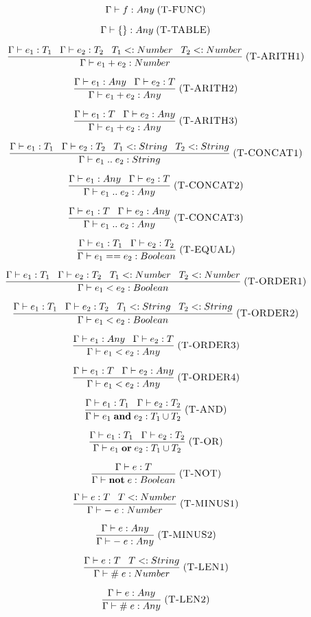 \documentclass[12pt]{article}
\newcommand{\mylabel}[1]{\; (\textsc{#1})}
\newcommand{\subtype}{<:}
\newcommand{\kw}[1]{\mathbf{#1} \;}
\newcommand{\env}{\Gamma}
\begin{document}
\[
\env \vdash f : Any
\mylabel{T-FUNC}
\]

\[
\env \vdash \{\} : Any
\mylabel{T-TABLE}
\]

\[
\frac{\env \vdash e_{1}:T_{1} \;\;\;
      \env \vdash e_{2}:T_{2} \;\;\;
      T_{1} \subtype Number \;\;\;
      T_{2} \subtype Number}
     {\env \vdash e_{1} + e_{2} : Number}
\mylabel{T-ARITH1}
\]

\[
\frac{\env \vdash e_{1}:Any \;\;\;
      \env \vdash e_{2}:T}
     {\env \vdash e_{1} + e_{2} : Any}
\mylabel{T-ARITH2}
\]

\[
\frac{\env \vdash e_{1}:T \;\;\;
      \env \vdash e_{2}:Any}
     {\env \vdash e_{1} + e_{2} : Any}
\mylabel{T-ARITH3}
\]

\[
\frac{\env \vdash e_{1}:T_{1} \;\;\;
      \env \vdash e_{2}:T_{2} \;\;\;
      T_{1} \subtype String \;\;\;
      T_{2} \subtype String}
     {\env \vdash e_{1} \; {..} \;  e_{2} : String}
\mylabel{T-CONCAT1}
\]

\[
\frac{\env \vdash e_{1}:Any \;\;\;
      \env \vdash e_{2}:T}
     {\env \vdash e_{1} \; {..} \; e_{2} : Any}
\mylabel{T-CONCAT2}
\]

\[
\frac{\env \vdash e_{1}:T \;\;\;
      \env \vdash e_{2}:Any}
     {\env \vdash e_{1} \; {..} \; e_{2} : Any}
\mylabel{T-CONCAT3}
\]

\[
\frac{\env \vdash e_{1}:T_{1} \;\;\;
      \env \vdash e_{2}:T_{2}}
     {\env \vdash e_{1} == e_{2} : Boolean}
\mylabel{T-EQUAL}
\]

\[
\frac{\env \vdash e_{1}:T_{1} \;\;\;
      \env \vdash e_{2}:T_{2} \;\;\;
      T_{1} \subtype Number \;\;\;
      T_{2} \subtype Number}
     {\env \vdash e_{1} < e_{2} : Boolean}
\mylabel{T-ORDER1}
\]

\[
\frac{\env \vdash e_{1}:T_{1} \;\;\;
      \env \vdash e_{2}:T_{2} \;\;\;
      T_{1} \subtype String \;\;\;
      T_{2} \subtype String}
     {\env \vdash e_{1} < e_{2} : Boolean}
\mylabel{T-ORDER2}
\]

\[
\frac{\env \vdash e_{1}:Any \;\;\;
      \env \vdash e_{2}:T}
     {\env \vdash e_{1} < e_{2} : Any}
\mylabel{T-ORDER3}
\]

\[
\frac{\env \vdash e_{1}:T \;\;\;
      \env \vdash e_{2}:Any}
     {\env \vdash e_{1} < e_{2} : Any}
\mylabel{T-ORDER4}
\]

\[
\frac{\env \vdash e_{1}:T_{1} \;\;\;
      \env \vdash e_{2}:T_{2}}
     {\env \vdash e_{1} \; \kw{and} e_{2} : T_{1} \cup T_{2}}
\mylabel{T-AND}
\]

\[
\frac{\env \vdash e_{1}:T_{1} \;\;\;
      \env \vdash e_{2}:T_{2}}
     {\env \vdash e_{1} \; \kw{or} e_{2} : T_{1} \cup T_{2}}
\mylabel{T-OR}
\]

\[
\frac{\env \vdash e:T}
     {\env \vdash \kw{not} e : Boolean}
\mylabel{T-NOT}
\]

\[
\frac{\env \vdash e:T \;\;\;
      T \subtype Number}
     {\env \vdash - \; e : Number}
\mylabel{T-MINUS1}
\]

\[
\frac{\env \vdash e:Any}
     {\env \vdash - \; e : Any}
\mylabel{T-MINUS2}
\]

\[
\frac{\env \vdash e:T \;\;\;
      T \subtype String}
     {\env \vdash \# \; e : Number}
\mylabel{T-LEN1}
\]

\[
\frac{\env \vdash e:Any}
     {\env \vdash \# \; e : Any}
\mylabel{T-LEN2}
\]
\end{document}

